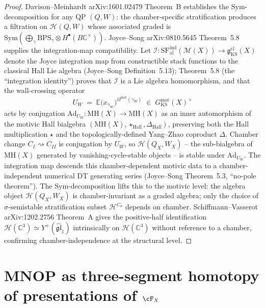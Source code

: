 \begin{proof}
Davison--Meinhardt \textup{arXiv:1601.02479} Theorem~B establishes the
$\mathrm{Sym}$-decomposition for any QP $(Q, W)$: the chamber-specific
stratification produces a filtration on $\mathcal{H}(Q, W)$ whose
associated graded is $\mathrm{Sym}(\bigoplus_\gamma \mathrm{BPS}_\gamma
\otimes H^\bullet(B\mathbb{C}^\times))$. Joyce--Song
\textup{arXiv:0810.5645} Theorem~5.8 supplies the integration-map
compatibility. Let
$\mathcal{I} \colon \mathrm{SF}_{\mathrm{al}}^{\mathrm{ind}}(\mathcal{M}(X))
\to \mathfrak{g}_{\mathrm{KS}}^{\mathrm{cl}}(X)$
denote the Joyce integration map from constructible stack functions
to the classical Hall Lie algebra (Joyce--Song Definition~5.13);
Theorem~5.8 (the ``integration identity'') proves that $\mathcal{I}$
is a Lie algebra homomorphism, and that the wall-crossing operator
\[
 U_W \;=\; \mathbb{E}\bigl(x_{\gamma_W}\bigr)^{\Omega^{\mathrm{mot}}
 (\gamma_W)}
 \;\in\; G_{\mathrm{KS}}^{\mathrm{mot}}(X)^{\times}
\]
acts by conjugation
$\mathrm{Ad}_{U_W} \colon \mathrm{MH}(X) \to \mathrm{MH}(X)$ as an
inner automorphism of the motivic Hall bialgebra
$(\mathrm{MH}(X), \star_{\mathrm{Hall}}, \Delta_{\mathrm{Hall}})$,
preserving both the Hall multiplication $\star$ and the
topologically-defined Yang--Zhao coproduct $\Delta$. Chamber change
$C_I \rightsquigarrow C_{II}$ is conjugation by $U_W$, so
$\mathcal{H}(Q_X, W_X)$ -- the sub-bialgebra of
$\mathrm{MH}(X)$ generated by vanishing-cycle-stable objects --
is stable under $\mathrm{Ad}_{U_W}$. The integration map descends
this chamber-dependent motivic data to a chamber-independent numerical
DT generating series (Joyce--Song Theorem~5.3, ``no-pole theorem'').
The $\mathrm{Sym}$-decomposition lifts this to the motivic level:
the algebra object $\mathcal{H}(Q_X, W_X)$ is chamber-invariant as a
graded algebra; only the choice of $\sigma$-semistable stratification
subset $\mathcal{H}^{C_\sigma}$ depends on chamber.
Schiffmann--Vasserot \textup{arXiv:1202.2756} Theorem~A gives the
positive-half identification $\mathcal{H}(\mathbb{C}^3) \simeq
Y^+(\widehat{\mathfrak{gl}}_1)$ intrinsically on
$\mathcal{H}(\mathbb{C}^3)$ without reference to a chamber, confirming
chamber-independence at the structural level.
\end{proof}

\section{MNOP as three-segment homotopy of presentations of \texorpdfstring{$\cF_X$}{F-X}}
\label{sec:mnop-three-segment-homotopy}

